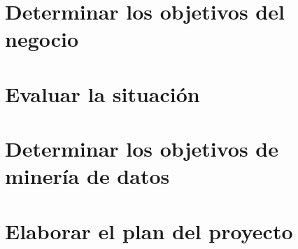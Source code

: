 \documentclass[11pt,letterpaper,DIV=12]{scrartcl}
\begin{document}


\tableofcontents
\clearpage

\section{Determinar los objetivos del negocio}





\section{Evaluar la situación}







\section{Determinar los objetivos de minería de datos}




\section{Elaborar el plan del proyecto}




\printbibliography
\end{document}
